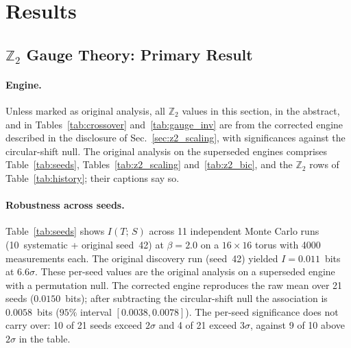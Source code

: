 \documentclass[aps,pra,twocolumn,superscriptaddress,showpacs,floatfix]{revtex4-2}
\newcommand{\Ztwo}{\mathbb{Z}_2}
\newcommand{\MI}{I(T;\,S)}
\begin{document}
\section{Results}
\label{sec:results}

\subsection{$\Ztwo$ Gauge Theory: Primary Result}

\paragraph{Engine.}
Unless marked as original analysis, all $\Ztwo$ values in this section, in the abstract, and in Tables~\ref{tab:crossover} and~\ref{tab:gauge_inv} are from the corrected engine described in the disclosure of Sec.~\ref{sec:z2_scaling}, with significances against the circular-shift null. The original analysis on the superseded engines comprises Table~\ref{tab:seeds}, Tables~\ref{tab:z2_scaling} and~\ref{tab:z2_bic}, and the $\Ztwo$ rows of Table~\ref{tab:history}; their captions say so.

\paragraph{Robustness across seeds.}
Table~\ref{tab:seeds} shows $\MI$ across 11 independent Monte Carlo runs
(10~systematic + original seed~42) at $\beta = 2.0$ on a $16 \times 16$ torus
with 4000 measurements each. The original discovery run (seed~42) yielded
$I = 0.011$~bits at $6.6\sigma$.
These per-seed values are the original analysis on a superseded engine with a permutation null. The corrected engine reproduces the raw mean over 21 seeds ($0.0150$~bits); after subtracting the circular-shift null the association is $0.0058$~bits ($95\%$ interval $[0.0038, 0.0078]$). The per-seed significance does not carry over: 10 of 21 seeds exceed $2\sigma$ and 4 of 21 exceed $3\sigma$, against 9 of 10 above $2\sigma$ in the table.
\end{document}
